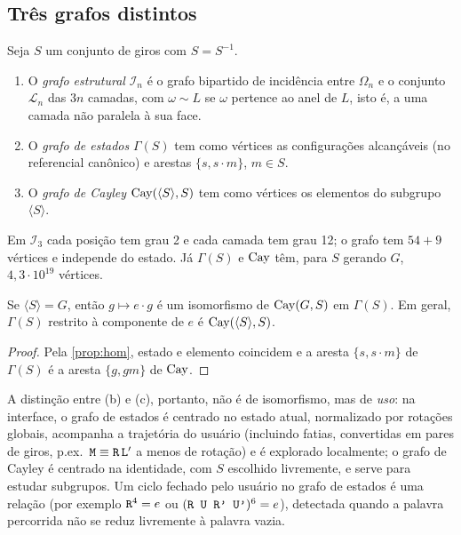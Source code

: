 \subsection{Três grafos distintos}\label{sec:tres-grafos}
\begin{definition}\label{def:tres}
Seja $S$ um conjunto de giros com $S=S^{-1}$.
\begin{enumerate}[nosep,label=(\alph*)]
\item O \emph{grafo estrutural} $\mathcal I_n$ é o grafo bipartido de incidência entre $\Omega_n$ e o conjunto $\mathcal L_n$ das $3n$ camadas, com $\omega\sim L$ se $\omega$ pertence ao anel de $L$, isto é, a uma camada não paralela à sua face.
\item O \emph{grafo de estados} $\Gamma(S)$ tem como vértices as configurações alcançáveis (no referencial canônico) e arestas $\{s,s\cdot m\}$, $m\in S$.
\item O \emph{grafo de Cayley} $\operatorname{Cay}(\langle S\rangle,S)$ tem como vértices os elementos do subgrupo $\langle S\rangle$.
\end{enumerate}
\end{definition}
Em $\mathcal I_3$ cada posição tem grau 2 e cada camada tem grau 12; o grafo tem $54+9$ vértices e independe do estado. Já $\Gamma(S)$ e $\operatorname{Cay}$ têm, para $S$ gerando $G$, $4{,}3\cdot10^{19}$ vértices.
\begin{proposition}\label{prop:iso}\lit
Se $\langle S\rangle=G$, então $g\mapsto e\cdot g$ é um isomorfismo de $\operatorname{Cay}(G,S)$ em $\Gamma(S)$. Em geral, $\Gamma(S)$ restrito à componente de $e$ é $\operatorname{Cay}(\langle S\rangle,S)$.
\end{proposition}
\begin{proof}
Pela \cref{prop:hom}, estado e elemento coincidem e a aresta $\{s,s\cdot m\}$ de $\Gamma(S)$ é a aresta $\{g,gm\}$ de $\operatorname{Cay}$.
\end{proof}
A distinção entre (b) e (c), portanto, não é de isomorfismo, mas de \emph{uso}: na interface, o grafo de estados é centrado no estado atual, normalizado por rotações globais, acompanha a trajetória do usuário (incluindo fatias, convertidas em pares de giros, p.ex.\ $\texttt{M}\equiv\texttt{R}\,\texttt{L}'$ a menos de rotação) e é explorado localmente; o grafo de Cayley é centrado na identidade, com $S$ escolhido livremente, e serve para estudar subgrupos. Um ciclo fechado pelo usuário no grafo de estados é uma relação (por exemplo $\texttt{R}^4=e$ ou $(\texttt{R U R' U'})^6=e$), detectada quando a palavra percorrida não se reduz livremente à palavra vazia.

